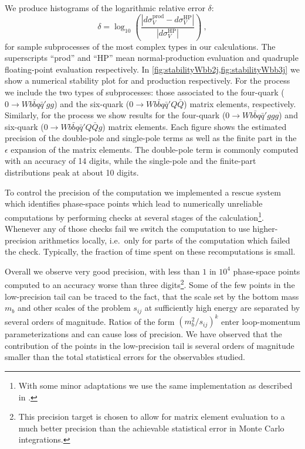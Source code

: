 We produce histograms of the logarithmic relative error $\delta$:
\begin{equation}
  \delta = \log_{10}\left(\frac{\left|d\sigma^{\text{prod}}_V - d\sigma^{\text{HP}}_V\right|}{\left|d\sigma^{\text{HP}}_V\right|}\right)\ ,
  \label{reldiff}
\end{equation}
for sample subprocesses of the most complex types in our calculations. 
The superscripts ``prod'' and ``HP'' mean normal-production evaluation and
quadruple floating-point evaluation respectively.
In \cref{fig:stabilityWbb2j,fig:stabilityWbb3j} we show a numerical stability plot for \Wbbjj{} and
\Wbbjjj{} production respectively. For the \Wbbjj{} process we include the two types of
subprocesses: those associated to the four-quark ($0\rightarrow Wb{\bar b}q{\bar q}'gg$)
and the six-quark ($0\rightarrow Wb{\bar b}q{\bar q}'Q{\bar Q}$) matrix elements, respectively.
Similarly, for the \Wbbjjj{} process we show results for the four-quark ($0\rightarrow Wb{\bar b}q{\bar q}'ggg$)
and six-quark ($0\rightarrow Wb{\bar b}q{\bar q}'Q{\bar Q}g$) matrix elements.
%
Each figure shows the estimated precision of the double-pole and
single-pole terms as well as the finite part in the $\epsilon$ expansion of the 
matrix elements. The double-pole term is
commonly computed with an accuracy of 14 digits, while the single-pole and the
finite-part distributions peak at about 10 digits.

To control the precision of the computation we implemented a rescue system which 
identifies phase-space points 
which lead to numerically unreliable computations
by performing checks at several
stages of the calculation\footnote{With some minor adaptations we use the same
implementation as described in \cite{Berger:2008sj,BH:W3jDistributions}.}. Whenever
any of those checks fail we switch the computation to use higher-precision 
arithmetics  locally, i.e.\ only for parts of the computation which failed the check.
Typically, the fraction of time spent on these recomputations is small.

Overall we observe
very good precision, with less than $1$ in $10^4$ phase-space
points computed to an accuracy worse than three digits\footnote{This precision target 
is chosen to allow for matrix element evaluation to a much better
precision than the achievable statistical 
error in Monte Carlo integrations.}.
%
Some of the few points in the low-precision tail
can be traced
to the fact, that the scale set by the bottom mass $m_b$ and other scales of the problem $s_{ij}$ at
sufficiently high energy are separated by several orders of magnitude.
Ratios of the form $(m_b^2/s_{ij})^k$ enter loop-momentum parameterizations and can cause loss of precision.
%
We have observed that
the contribution of the points in the low-precision tail is several orders of magnitude smaller than the total
statistical errors for the observables studied.

